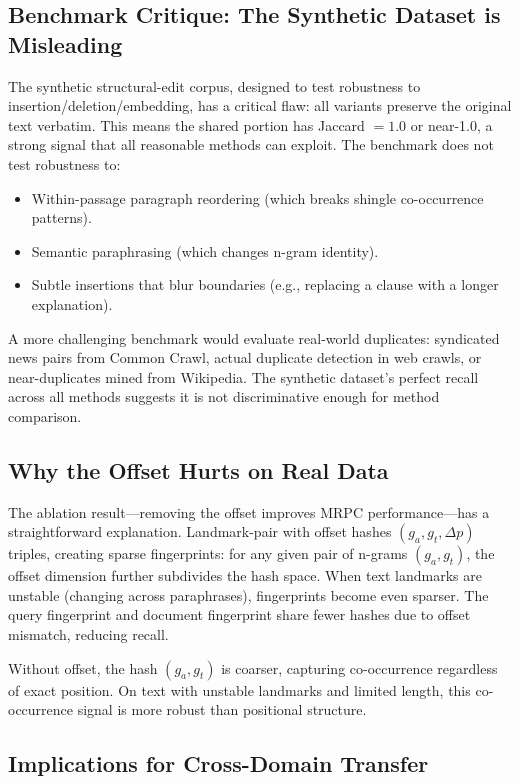 \documentclass[11pt,letterpaper]{article}
\begin{document}
\subsection{Benchmark Critique: The Synthetic Dataset is Misleading}

The synthetic structural-edit corpus, designed to test robustness to insertion/deletion/embedding, has a critical flaw: all variants preserve the original text verbatim. This means the shared portion has Jaccard $= 1.0$ or near-1.0, a strong signal that all reasonable methods can exploit. The benchmark does not test robustness to:
\begin{itemize}
  \item Within-passage paragraph reordering (which breaks shingle co-occurrence patterns).
  \item Semantic paraphrasing (which changes n-gram identity).
  \item Subtle insertions that blur boundaries (e.g., replacing a clause with a longer explanation).
\end{itemize}

A more challenging benchmark would evaluate real-world duplicates: syndicated news pairs from Common Crawl, actual duplicate detection in web crawls, or near-duplicates mined from Wikipedia. The synthetic dataset's perfect recall across all methods suggests it is not discriminative enough for method comparison.

\subsection{Why the Offset Hurts on Real Data}

The ablation result---removing the offset improves MRPC performance---has a straightforward explanation. Landmark-pair with offset hashes $(g_a, g_t, \Delta p)$ triples, creating sparse fingerprints: for any given pair of n-grams $(g_a, g_t)$, the offset dimension further subdivides the hash space. When text landmarks are unstable (changing across paraphrases), fingerprints become even sparser. The query fingerprint and document fingerprint share fewer hashes due to offset mismatch, reducing recall.

Without offset, the hash $(g_a, g_t)$ is coarser, capturing co-occurrence regardless of exact position. On text with unstable landmarks and limited length, this co-occurrence signal is more robust than positional structure.

\subsection{Implications for Cross-Domain Transfer}
\end{document}
